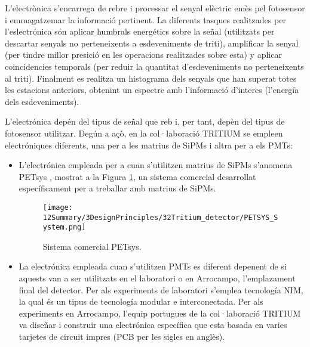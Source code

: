 L'electrònica s'encarrega de rebre i processar el senyal elèctric emès pel fotosensor i emmagatzemar la informació pertinent. La diferents tasques realitzades per l'eslectrónica són aplicar humbrals energétics sobre la señal (utilitzats per descartar senyals no perteneixents a esdeveniments de triti), amplificar la senyal (per tindre millor presició en les operacions realitzades sobre esta) y aplicar coincidencies temporals (per reduir la quantitat d'esdeveniments no perteneixents al triti). Finalment es realitza un histograma dels senyals que han superat totes les estacions anteriors, obtenint un espectre amb l'informació d'interes (l'energía dels esdeveniments). 

L'electrónica depén del tipus de señal que reb i, per tant, depèn del tipus de fotosensor utilitzar. Degún a açò, en la col·laboració TRITIUM se empleen electróniques diferents, una per a les matrius de SiPMs i altra per a els PMTs:

\begin{itemize}

\item{} L'electrónica empleada per a cuan s'utilitzen matrius de SiPMs s'anomena PETsys \cite{PETSYS}, mostrat a la Figura \ref{fig:PETSYSs}, un sistema comercial desarrollat específicament per a treballar amb matrius de SiPMs. 

\begin{figure}[h]
\texttt{[image: 12Summary/3DesignPrinciples/32Tritium\_detector/PETSYS\_System.png]}
\centering
\caption{Sistema comercial PETsys\label{fig:PETSYSs}.}
\end{figure}

\item{} La electrónica empleada cuan s'utilitzen PMTs es diferent depenent de si aquests van a ser utilitzats en el laboratori o en Arrocampo, l'emplazament final del detector. Per als experiments de laboratori s'emplea tecnología NIM, la qual és un tipus de tecnología modular e interconectada. Per als experiments en Arrocampo, l'equip portugues de la col·laboració TRITIUM va diseñar i construir una electrónica específica que esta basada en varies tarjetes de circuit impres (PCB per les sigles en anglès).

\end{itemize}
